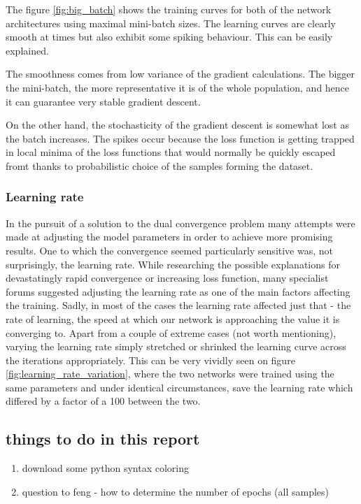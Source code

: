 \documentclass[a4paper, 12pt]{article}
\numberwithin{equation}{section}
\begin{document}
	The figure \ref{fig:big_batch} shows the training curves for both of the network architectures using maximal mini-batch sizes. The learning curves are clearly smooth at times but also exhibit some spiking behaviour. This can be easily explained.
	
	The smoothness comes from low variance of the gradient calculations. The bigger the mini-batch, the more representative it is of the whole population, and hence it can guarantee very stable gradient descent.
	
	On the other hand, the stochasticity of the gradient descent is somewhat lost as the batch increases. The spikes occur because the loss function is getting trapped in local minima of the loss functions that would normally be quickly escaped fromt thanks to probabilistic choice of the samples forming the dataset.
	
	\subsubsection{Learning rate}
	
	In the pursuit of a solution to the dual convergence problem many attempts were made at adjusting the model parameters in order to achieve more promising results. One to which the convergence seemed particularly sensitive was, not surprisingly, the learning rate. While researching the possible explanations for devastatingly rapid convergence or increasing loss function, many specialist forums suggested adjusting the learning rate as one of the main factors affecting the training. Sadly, in most of the cases the learning rate affected just that - the rate of learning, the speed at which our network is approaching the value it is converging to. Apart from a couple of extreme cases (not worth mentioning), varying the learning rate simply stretched or shrinked the learning curve across the iterations appropriately. This can be very vividly seen on figure \ref{fig:learning_rate_variation}, where the two networks were trained using the same parameters and under identical circumstances, save the learning rate which differed by a factor of a 100 between the two.
	
	
	\newpage
	\clearpage
	\subsection{things to do in this report}
	\begin{enumerate}
		\item download some python syntax coloring
		\item question to feng - how to determine the number of epochs (all samples)
			

	\end{enumerate}
	
	
	\newpage
	
	\clearpage
	
	\newpage
	\pagestyle{plain}
	
	
	
	
\end{document}
